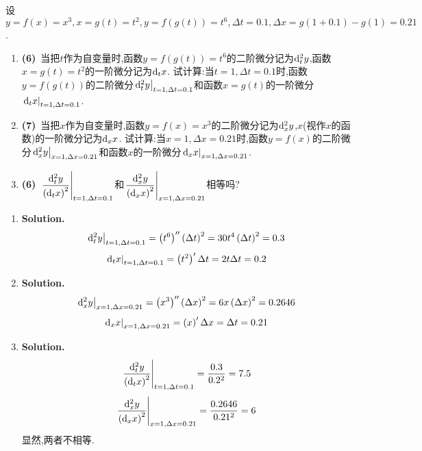 \documentclass{ctexart}
\begin{document}
\begin{problem}[6.(20\songti{分})]
    设$y=f(x)=x^3,x=g(t)=t^2,y=f(g(t))=t^6,\Delta t=0.1,\Delta x=g(1+0.1)-g(1)=0.21$.
        \begin{enumerate}[label=\textbf{(\arabic*)}]
            \item \textbf{(6)}\ 当把$t$作为自变量时,函数$y=f(g(t))=t^6$的二阶微分记为$\mathrm{d}_t^2y$,函数$x=g(t)=t^2$的一阶微分记为$\mathrm{d}_tx$.
                试计算:当$t=1,\Delta t=0.1$时,函数$y=f(g(t))$的二阶微分$\left.\mathrm{d}_t^2y\right|_{t=1,\Delta t=0.1}$和函数$x=g(t)$的一阶微分$\left.\mathrm{d}_tx\right|_{t=1,\Delta t=0.1}$.
            \item \textbf{(7)}\ 当把$x$作为自变量时,函数$y=f(x)=x^3$的二阶微分记为$\mathrm{d}_x^2y$,$x$(视作$x$的函数)的一阶微分记为$\mathrm{d}_xx$.
                试计算:当$x=1,\Delta x=0.21$时,函数$y=f(x)$的二阶微分$\left.\mathrm{d}_x^2y\right|_{x=1,\Delta x=0.21}$和函数$x$的一阶微分$\left.\mathrm{d}_xx\right|_{x=1,\Delta x=0.21}$.
            \item \textbf{(6)}\ $\left.\dfrac{\mathrm{d}_t^2y}{\left(\mathrm{d}_tx\right)^2}\right|_{t=1,\Delta t=0.1}$和$\left.\dfrac{\mathrm{d}_x^2y}{\left(\mathrm{d}_xx\right)^2}\right|_{x=1,\Delta x=0.21}$相等吗?
        \end{enumerate}
\end{problem}
\begin{solution}
    \begin{enumerate}[label=\textbf{(\arabic*)}]
        \item \textbf{Solution.}
            $$\left.\mathrm{d}_t^2y\right|_{t=1,\Delta t=0.1}=\left(t^6\right)''\left(\Delta t\right)^2=30t^4\left(\Delta t\right)^2=0.3$$
            $$\left.\mathrm{d}_tx\right|_{t=1,\Delta t=0.1}=\left(t^2\right)'\Delta t=2t\Delta t=0.2$$
        \item \textbf{Solution.}
            $$\left.\mathrm{d}_x^2y\right|_{x=1,\Delta x=0.21}=\left(x^3\right)''\left(\Delta x\right)^2=6x\left(\Delta x\right)^2=0.2646$$
            $$\left.\mathrm{d}_xx\right|_{x=1,\Delta x=0.21}=\left(x\right)'\Delta x=\Delta t=0.21$$
        \item \textbf{Solution.}
            $$\left.\dfrac{\mathrm{d}_t^2y}{\left(\mathrm{d}_tx\right)^2}\right|_{t=1,\Delta t=0.1}=\dfrac{0.3}{0.2^2}=7.5$$
            $$\left.\dfrac{\mathrm{d}_x^2y}{\left(\mathrm{d}_xx\right)^2}\right|_{x=1,\Delta x=0.21}=\dfrac{0.2646}{0.21^2}=6$$
            显然,两者不相等.
    \end{enumerate}
\end{solution}
\end{document}

